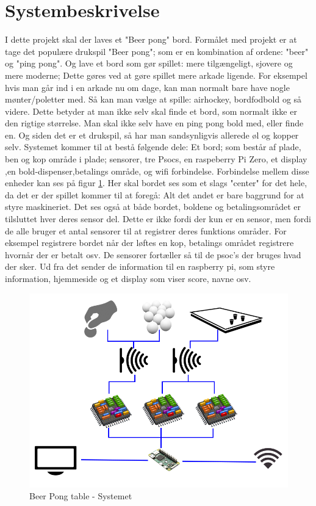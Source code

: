 \documentclass[Kravspecifikation/Kravspec_Main.tex]{subfiles}
\begin{document}
\section{Systembeskrivelse}
I dette projekt skal der laves et "Beer pong" bord. Formålet med projekt er at tage det populære drukspil "Beer pong"; som er en kombination af ordene: "beer" og "ping pong". Og lave et bord som gør spillet: mere tilgængeligt, sjovere og mere moderne; Dette gøres ved at gøre spillet mere arkade ligende. For eksempel hvis man går ind i en arkade nu om dage, kan man normalt bare have nogle mønter/poletter med. Så kan man vælge at spille: airhockey, bordfodbold og så videre.  \newline 
Dette betyder at man ikke selv skal finde et bord, som normalt ikke er den rigtige størrelse. Man skal ikke selv have en ping pong bold med, eller finde en. Og siden det er et drukspil, så har man sandsynligvis allerede øl og kopper selv. \newline 
Systemet kommer til at bestå følgende dele: Et bord; som består af plade, ben og kop område i plade; sensorer, tre Psocs, en raspeberry Pi Zero, et display ,en bold-dispenser,betalings område, og wifi forbindelse. Forbindelse mellem disse enheder kan ses på figur \ref{fig:systemet}. \newline
Her skal bordet ses som et slags "center" for det hele, da det er der spillet kommer til at foregå: Alt det andet er bare baggrund for at styre maskineriet. Det ses også at både bordet, boldene og betalingsområdet er tilsluttet hver deres sensor del. Dette er ikke fordi der kun er en sensor, men fordi de alle bruger et antal sensorer til at registrer deres funktions områder. For eksempel registrere bordet når der løftes en kop, betalings området registrere hvornår der er betalt osv. 
De sensorer fortæller så til de psoc's der bruges hvad der sker. Ud fra det sender de information til en raspberry pi, som styre information, hjemmeside og et display som viser score, navne osv. 

\begin{figure}[H]
    \centering
    \includegraphics[scale=0.45]{Kravspecifikation/Systembeskrivelse/pics/Systembeskrivelse.png}
    \caption{Beer Pong table - Systemet}
    \label{fig:systemet}
\end{figure}
\end{document}
